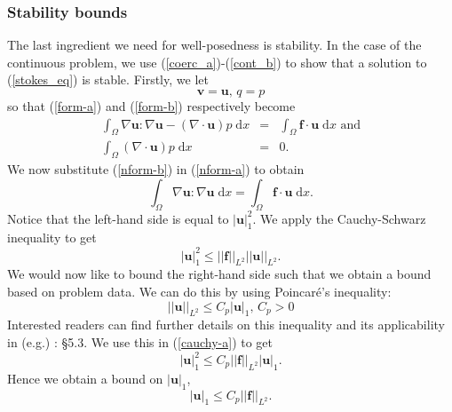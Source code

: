 \documentclass[12pt,a4paper]{article}
\theoremstyle{definition}
\begin{document}
\subsubsection{Stability bounds}\label{sec_stability_bounds}
The last ingredient we need for well-posedness is stability.  In the case of the continuous problem, we use (\ref{coerc_a})-(\ref{cont_b}) to show that a solution to (\ref{stokes_eq}) is stable. Firstly, we let 
\begin{equation}
	\textbf{v}=\textbf{u},\, q =p
\end{equation}
so that (\ref{form-a}) and (\ref{form-b}) respectively become
\begin{eqnarray}\label{nform-a}
\int_{\Omega}\nabla \textbf{u} : \nabla \textbf{u}-\left(\nabla \cdot \textbf{u}\right)p\;\mathrm{d}x  &=&\int_{\Omega}\textbf{f}\cdot \textbf{u} \;\mathrm{d}x
 \text{ and} \\\label{nform-b}
\int_{\Omega}\left(\nabla \cdot \textbf{u}\right)p\;\mathrm{d}x&=& 0.
\end{eqnarray}
We now substitute (\ref{nform-b}) in (\ref{nform-a}) to obtain
\begin{equation}
\int_{\Omega}\nabla \textbf{u} : \nabla \textbf{u}\;\mathrm{d}x  =\int_{\Omega}\textbf{f}\cdot \textbf{u} \;\mathrm{d}x.
\end{equation}
Notice that the left-hand side is equal to $\left|\textbf{u}\right|_1^2$.  We apply the Cauchy-Schwarz inequality to get
\begin{equation}\label{cauchy-a}
\left|\textbf{u}\right|_1^2\leq\left|\left|\textbf{f}\right|\right|_{L^2}\left|\left|\textbf{u}\right|\right|_{L^2}.
\end{equation}
We would now like to bound the right-hand side such that we obtain a bound based on problem data.  We can do this by using Poincar\'e's inequality:
\begin{equation} \label{bound_vel_poincare}
\left|\left|\textbf{u}\right|\right|_{L^2}\leq C_p\left|\textbf{u}\right|_1\text{, } C_p>0
\end{equation}
Interested readers can find further details on this inequality and its applicability  in (e.g.) \cite{brenner2007mathematical}: \S 5.3.  We use this in (\ref{cauchy-a}) to get
\begin{equation}\label{cauchy-b}
\left|\textbf{u}\right|_1^2\leq C_p\left|\left|\textbf{f}\right|\right|_{L^2} \left|\textbf{u}\right|_1.
\end{equation}
Hence we obtain a bound on $\left|\textbf{u}\right|_1$, 
\begin{equation}\label{bound-u-cont}
\left|\textbf{u}\right|_1\leq C_p\left|\left|\textbf{f}\right|\right|_{L^2}.
\end{equation}
\end{document}
